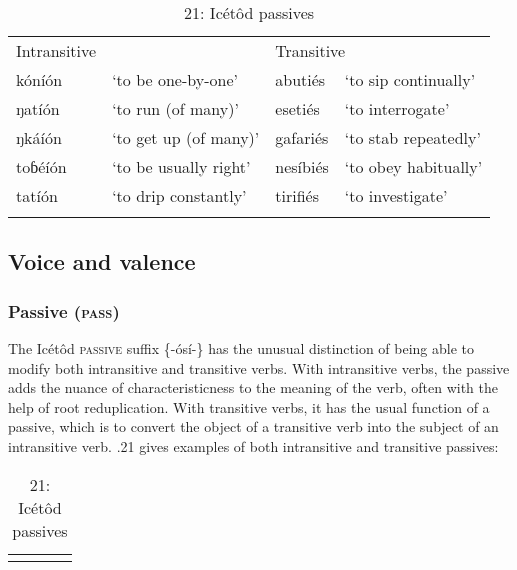 \begin{table}
\begin{table}
\caption{20: Icétôd pluractional verbs}
\label{tab:8}


\begin{tabularx}{\textwidth}{XXXX}
\lsptoprule

Intransitive &  & \multicolumn{2}{X}{Transitive}\\
kóníón & ‘to be one-by-one’ & abutiés & ‘to sip continually’\\
ŋatíón & ‘to run (of many)’ & esetiés & ‘to interrogate’\\
ŋkáíón & ‘to get up (of many)’ & gafariés & ‘to stab repeatedly’\\
toɓéíón & ‘to be usually right’ & nesíbiés & ‘to obey habitually’\\
tatíón & ‘to drip constantly’ & tirifiés & ‘to investigate’\\
\lspbottomrule
\end{tabularx}
\end{table}



\subsection{Voice and valence}
\subsubsection{Passive (\textsc{pass})}

The Icétôd \textsc{passive }suffix \{-ósí-\} has the unusual distinction of being able to modify both intransitive and transitive verbs. With intransitive verbs, the passive adds the nuance of characteristicness to the meaning of the verb, often with the help of root reduplication. With transitive verbs, it has the usual function of a passive, which is to convert the object of a transitive verb into the subject of an intransitive verb. .21 gives examples of both intransitive and transitive passives:


\begin{table}
\caption{21: Icétôd passives}
\label{tab:8}


\begin{tabularx}{\textwidth}{XXXX}
\lsptoprule


\end{tabularx}
\end{table}
\end{table}
